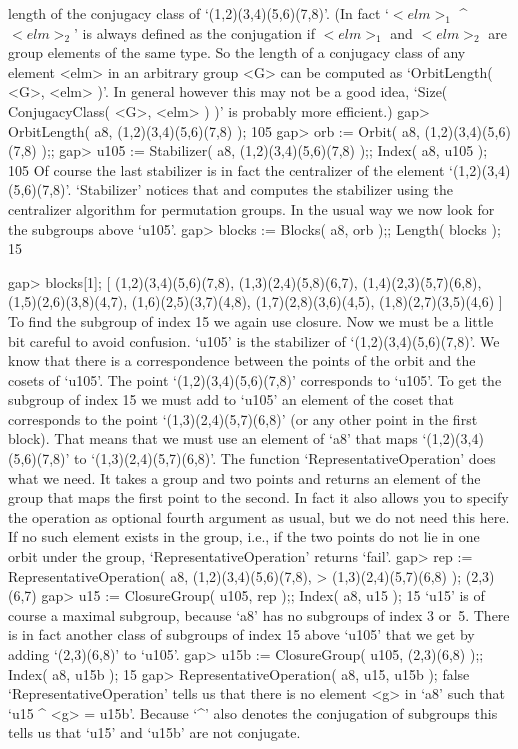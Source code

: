 length of  the  conjugacy   class of  `(1,2)(3,4)(5,6)(7,8)'.   (In  fact
`$<elm>_1$ ^ $<elm>_2$' is always defined as the conjugation if $<elm>_1$
and $<elm>_2$ are group elements  of the same  type. So  the length of  a
conjugacy  class of any  element <elm> in an   arbitrary group <G> can be
computed as `OrbitLength( <G>, <elm> )'.  In general however this may not
be a good  idea, `Size( ConjugacyClass( <G>,  <elm> ) )' is probably more
efficient.)
\beginexample
    gap> OrbitLength( a8, (1,2)(3,4)(5,6)(7,8) );
    105
    gap> orb := Orbit( a8, (1,2)(3,4)(5,6)(7,8) );;
    gap> u105 := Stabilizer( a8, (1,2)(3,4)(5,6)(7,8) );; Index( a8, u105 );
    105 
\endexample
Of course the  last stabilizer is in  fact the centralizer of the element
`(1,2)(3,4)(5,6)(7,8)'.  `Stabilizer' notices    that and computes    the
stabilizer using the centralizer algorithm for permutation groups. In the
usual way we now look for the subgroups above `u105'.
\beginexample
    gap> blocks := Blocks( a8, orb );; Length( blocks );
    15

    gap> blocks[1];
    [ (1,2)(3,4)(5,6)(7,8), (1,3)(2,4)(5,8)(6,7), (1,4)(2,3)(5,7)(6,8),
      (1,5)(2,6)(3,8)(4,7), (1,6)(2,5)(3,7)(4,8), (1,7)(2,8)(3,6)(4,5),
      (1,8)(2,7)(3,5)(4,6) ]
\endexample
To find the subgroup of index 15 we  again use closure. Now  we must be a
little bit  careful to avoid    confusion. `u105' is the  stabilizer   of
`(1,2)(3,4)(5,6)(7,8)'. We  know  that there is  a correspondence between
the  points  of  the   orbit and  the   cosets  of  `u105'.   The   point
`(1,2)(3,4)(5,6)(7,8)' corresponds   to `u105'.  To get  the  subgroup of
index 15 we  must add to `u105' an  element of the coset that corresponds
to the   point `(1,3)(2,4)(5,7)(6,8)' (or any other   point  in the first
block).  That means   that  we must  use  an  element of `a8'  that  maps
`(1,2)(3,4)(5,6)(7,8)' to  `(1,3)(2,4)(5,7)(6,8)'.        The    function
`RepresentativeOperation'   does what we need. It   takes a group and two
points and returns an  element of the group that  maps the first point to
the   second. In fact it   also allows you  to   specify the operation as
optional fourth argument as usual,  but we do  not need this here. If  no
such element exists in the  group, i.e., if the  two points do not lie in
one orbit under the group, `RepresentativeOperation' returns `fail'.
\beginexample
    gap> rep := RepresentativeOperation( a8, (1,2)(3,4)(5,6)(7,8),
    >                                        (1,3)(2,4)(5,7)(6,8) );
    (2,3)(6,7)
    gap> u15 := ClosureGroup( u105, rep );; Index( a8, u15 );
    15 
\endexample
`u15' is of course a maximal  subgroup, because `a8'  has no subgroups of
index 3 or~5.  There is in fact  another  class of subgroups  of index 15
above `u105' that we get by adding `(2,3)(6,8)' to `u105'.
\beginexample
    gap> u15b := ClosureGroup( u105, (2,3)(6,8) );; Index( a8, u15b );
    15 
    gap> RepresentativeOperation( a8, u15, u15b );
    false 
\endexample
`RepresentativeOperation' tells us that  there is no  element <g> in `a8'
such that `u15 ^ <g> = u15b'. Because `^' also denotes the conjugation of
subgroups this tells us  that  `u15' and  `u15b' are not  conjugate.

